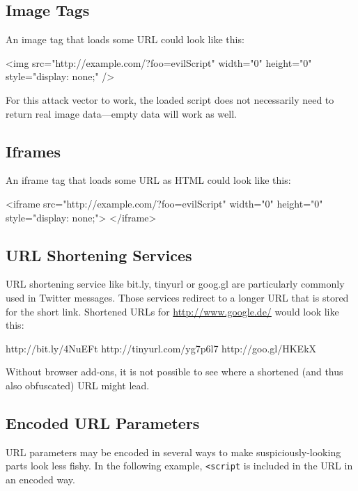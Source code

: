 \subsection{Image Tags}
An image tag that loads some URL could look like this:

\begin{htmlcode}
<img src="http://example.com/?foo=evilScript"
  width="0" height="0" style="display: none;" />
\end{htmlcode}

For this attack vector to work, the loaded script does not necessarily need to return real image data---empty data will work as well.


\subsection{Iframes}
An iframe tag that loads some URL as HTML could look like this:

\begin{htmlcode}
<iframe src="http://example.com/?foo=evilScript"
  width="0" height="0" style="display: none;">
</iframe>
\end{htmlcode}

\subsection{URL Shortening Services}
URL shortening service like bit.ly, tinyurl or goog.gl are particularly commonly used in Twitter messages. Those services redirect to a longer URL that is stored for the short link. Shortened URLs for \url{http://www.google.de/} would look like this:

\begin{textcode}
 http://bit.ly/4NuEFt
 http://tinyurl.com/yg7p6l7
 http://goo.gl/HKEkX
\end{textcode}

Without browser add-ons, it is not possible to see where a shortened (and thus also obfuscated) URL might lead.

\subsection{Encoded URL Parameters}
URL parameters may be encoded in several ways to make suspiciously-looking parts look less fishy. In the following example, \texttt{<script} is included in the URL in an encoded way.

